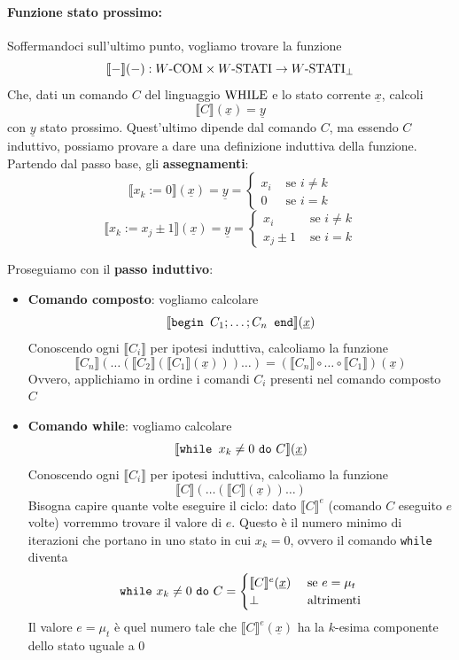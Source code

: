 \paragraph{Funzione stato prossimo:} Soffermandoci sull'ultimo punto, vogliamo trovare la funzione
$$  \llbracket - \rrbracket (-): W\text{-COM} \times W\text{-STATI} \rightarrow W\text{-STATI}_\bot $$
Che, dati un comando $C$ del linguaggio $\text{WHILE}$ e lo stato corrente $\underline{x}$, calcoli
$$ \llbracket C \rrbracket (\underline{x}) = \underline{y} $$
con $\underline{y}$ stato prossimo. Quest'ultimo dipende dal comando $C$, ma essendo $C$ induttivo, possiamo provare a dare una definizione induttiva della funzione.\\

Partendo dal passo base, gli \textbf{assegnamenti}:
$$
\llbracket x_k := 0 \rrbracket (\underline{x}) = \underline{y} = \begin{cases}
	x_i & \text{ se } i \neq k \\
	0 & \text{ se } i = k
\end{cases}
$$
$$ 
\llbracket x_k := x_j \pm 1 \rrbracket (\underline{x}) = \underline{y} = \begin{cases}
	x_i & \text{ se } i \neq k \\
	x_j \pm 1 & \text{ se } i = k
\end{cases}
$$

Proseguiamo con il \textbf{passo induttivo}:
\begin{itemize}
	\item \textbf{Comando composto}: vogliamo calcolare
	$$ \llbracket \text{\texttt{begin }} C_1; \dots; C_n \text{\texttt{ end}} \rrbracket (\underline{x}) $$
	Conoscendo ogni $\llbracket C_i \rrbracket$ per ipotesi induttiva, calcoliamo la funzione
	$$ \llbracket C_n \rrbracket \left(\dots \left(\llbracket C_2 \rrbracket \left(\llbracket C_1 \rrbracket (\underline{x})\right)\right) \dots \right) = \left(\llbracket C_n \rrbracket \circ \dots \circ \llbracket C_1 \rrbracket \right) (\underline{x}) $$
	Ovvero, applichiamo in ordine i comandi $C_i$ presenti nel comando composto $C$
	
	\item \textbf{Comando while}: vogliamo calcolare
	$$ \llbracket \text{\texttt{while }} x_k \neq 0 \text{ \texttt{do} } C \rrbracket (\underline{x}) $$
	Conoscendo ogni $\llbracket C_i \rrbracket$ per ipotesi induttiva, calcoliamo la funzione 
	$$ \llbracket C \rrbracket \left(\dots \left(\llbracket C \rrbracket (\underline{x})\right) \dots \right) $$
	Bisogna capire quante volte eseguire il ciclo: dato $\llbracket C \rrbracket^e$ (comando $C$ eseguito $e$ volte) vorremmo trovare il valore di $e$. Questo è il numero minimo di iterazioni che portano in uno stato in cui $x_k = 0$, ovvero il comando \texttt{while} diventa
	$$ \text{\texttt{while} } x_k \neq 0 \text{ \texttt{do} } C = \begin{cases}
		\llbracket C \rrbracket^e (\underline{x}) & \text{ se } e = \mu_t \\
		\bot & \text{ altrimenti}
	\end{cases}$$
	Il valore $e = \mu_t$ è quel numero tale che $\llbracket C \rrbracket^e (\underline{x})$ ha  la $k$-esima componente dello stato uguale a 0
\end{itemize}

